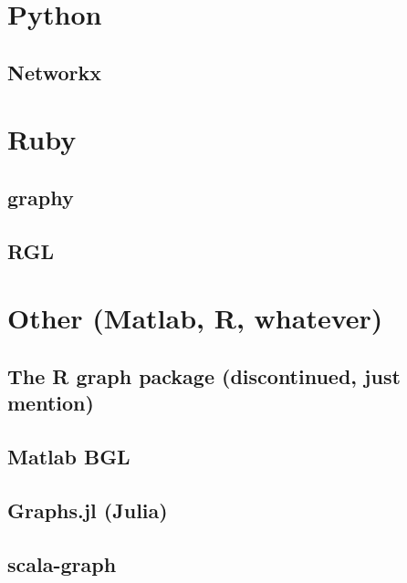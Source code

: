 \section{Python}
\label{sect:python}

	\subsection{Networkx}
	\label{ssect:networkx}



\section{Ruby}
\label{sect:ruby}

	\subsection{graphy}
	\label{ssect:graphyphStream}
	
	\subsection{RGL}
	\label{ssect:rgl}



\section{Other (Matlab, R, whatever)}
\label{sect:other}

	\subsection{The R graph package (discontinued, just mention)}
	\label{ssect:rgraph}
	
	\subsection{Matlab BGL}
	\label{ssect:matlab_bgl}
	
	\subsection{Graphs.jl (Julia)}
	\label{ssect:graphjl}
	
	\subsection{scala-graph}
	\label{ssect:scala_graph}
	
